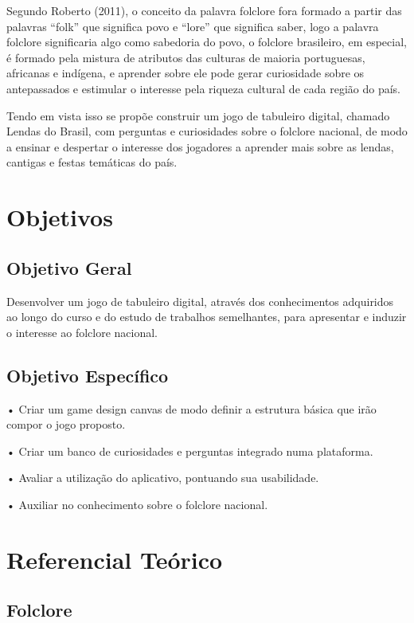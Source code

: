 \documentclass[12pt]{article}
\begin{document}
Segundo Roberto (2011), o conceito da palavra folclore fora formado a partir das palavras “folk” que significa povo e “lore” que significa saber, logo a palavra folclore significaria algo como sabedoria do povo, o folclore brasileiro, em especial, é formado pela mistura de atributos das culturas de maioria portuguesas, africanas e indígena, e aprender sobre ele pode gerar curiosidade sobre os antepassados e estimular o interesse pela riqueza cultural de cada região do país.

Tendo em vista isso se propõe construir um jogo de tabuleiro digital, chamado Lendas do Brasil, com perguntas e curiosidades sobre o folclore nacional, de modo a ensinar e despertar o interesse dos jogadores a aprender mais sobre as lendas, cantigas e festas temáticas do país.

\section{Objetivos}

\subsection{Objetivo Geral}

Desenvolver um jogo de tabuleiro digital, através dos conhecimentos adquiridos ao longo do curso e do estudo de trabalhos semelhantes, para apresentar e induzir o interesse ao folclore nacional.

\subsection{Objetivo Específico}

•	Criar um game design canvas de modo definir a estrutura básica que irão compor o jogo proposto.

•	Criar um banco de curiosidades e perguntas integrado numa plataforma.

•	Avaliar a utilização do aplicativo, pontuando sua usabilidade.

•	Auxiliar no conhecimento sobre o folclore nacional.


\section{Referencial Teórico}

\subsection{Folclore}
\end{document}

